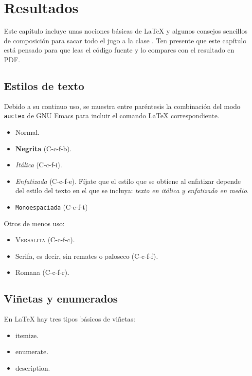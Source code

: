 \chapter{Resultados}
\label{chap:resultados}

Este capítulo incluye unas nociones básicas de \LaTeX{} y algunos consejos
sencillos de composición para sacar todo el jugo a la clase \esitfg. Ten
presente que este capítulo está pensado para que leas el código fuente y lo
compares con el resultado en PDF.

\section{Estilos de texto}

Debido a su continuo uso, se muestra entre paréntesis la combinación del modo
\texttt{auctex} de GNU Emacs para incluir el comando \LaTeX{} correspondiente.

\begin{itemize}
\item Normal.
\item \textbf{Negrita} (C-c-f-b).
\item \textit{Itálica} (C-c-f-i).
\item \emph{Enfatizada} (C-c-f-e). Fíjate que el estilo que se obtiene al
  enfatizar depende del estilo del texto en el que se incluya: \textit{texto en
    itálica y \emph{enfatizado} en medio}.
\item \texttt{Monoespaciada} (C-c-f-t)
\end{itemize}

Otros de menos uso:

\begin{itemize}
\item \textsc{Versalita} (C-c-f-c).
\item \textsf{Serifa}, es decir, sin remates o paloseco (C-c-f-f).
\item \textrm{Romana} (C-c-f-r).
\end{itemize}


\section{Viñetas y enumerados}

En \LaTeX{} hay tres tipos básicos de viñetas:

\begin{itemize}
\item itemize.
\item enumerate.
\item description.
\end{itemize}


